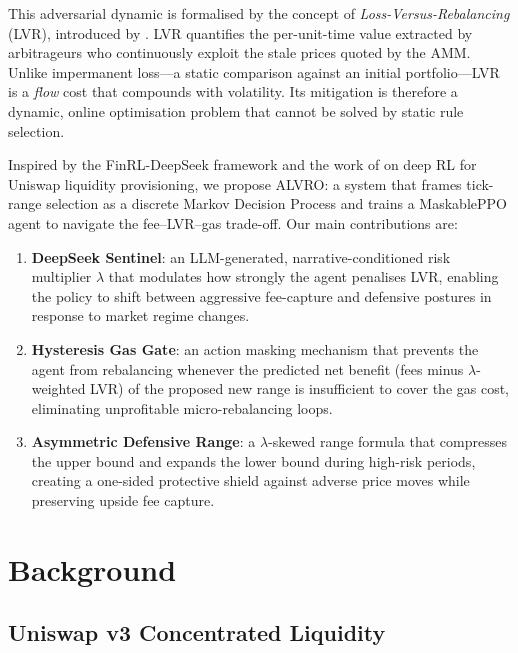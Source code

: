 \documentclass{article}
\begin{document}
This adversarial dynamic is formalised by the concept of
\emph{Loss-Versus-Rebalancing} (LVR), introduced by \citet{milionis2022}.
LVR quantifies the per-unit-time value extracted by arbitrageurs who
continuously exploit the stale prices quoted by the AMM.  Unlike impermanent
loss---a static comparison against an initial portfolio---LVR is a
\emph{flow} cost that compounds with volatility.  Its mitigation is therefore
a dynamic, online optimisation problem that cannot be solved by static rule
selection.

Inspired by the FinRL-DeepSeek framework \citep{benhenda2025} and the
work of \citet{xu2025} on deep RL for Uniswap liquidity provisioning, we
propose ALVRO: a system that frames tick-range selection as a discrete
Markov Decision Process and trains a MaskablePPO agent \citep{huang2022maskableppo}
to navigate the fee--LVR--gas trade-off.  Our main contributions are:

\begin{enumerate}
  \item \textbf{DeepSeek Sentinel}: an LLM-generated, narrative-conditioned
        risk multiplier $\lambda$ that modulates how strongly the agent penalises
        LVR, enabling the policy to shift between aggressive fee-capture and
        defensive postures in response to market regime changes.

  \item \textbf{Hysteresis Gas Gate}: an action masking mechanism that
        prevents the agent from rebalancing whenever the predicted net benefit
        (fees minus $\lambda$-weighted LVR) of the proposed new range is
        insufficient to cover the gas cost, eliminating unprofitable
        micro-rebalancing loops.

  \item \textbf{Asymmetric Defensive Range}: a $\lambda$-skewed range formula
        that compresses the upper bound and expands the lower bound during
        high-risk periods, creating a one-sided protective shield against
        adverse price moves while preserving upside fee capture.
\end{enumerate}

\section{Background}

\subsection{Uniswap v3 Concentrated Liquidity}
\end{document}
